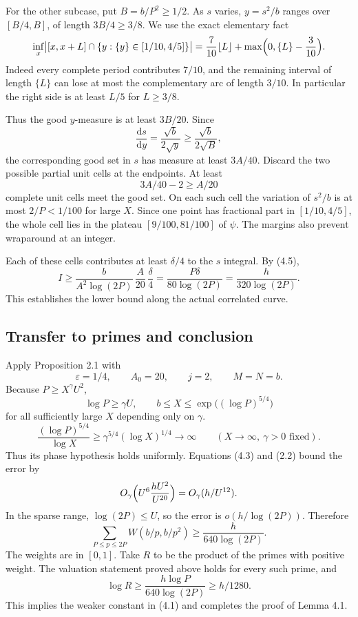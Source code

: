 \documentclass[letterpaper]{article}
\theoremstyle{definition}
\theoremstyle{remark}
\numberwithin{equation}{section}
\begin{document}
For the other subcase, put $B=b/P^2\ge 1/2$. As $s$ varies, $y=s^2/b$ ranges over $[B/4,B]$, of
length $3B/4\ge 3/8$. We use the exact elementary fact
\begin{equation}
  \inf_x\bigl|[x,x+L]\cap\{y:\{y\}\in[1/10,4/5]\}\bigr|=\frac{7}{10}\lfloor L\rfloor+\max\Bigl(0,\{L\}-\frac{3}{10}\Bigr).
\end{equation}
Indeed every complete period contributes $7/10$, and the remaining interval of length $\{L\}$ can
lose at most the complementary arc of length $3/10$. In particular the right side is at least $L/5$
for $L\ge 3/8$.

Thus the good $y$-measure is at least $3B/20$. Since
\[
  \frac{\mathrm ds}{\mathrm dy}=\frac{\sqrt b}{2\sqrt y}\ge\frac{\sqrt b}{2\sqrt B},
\]
the corresponding good set in $s$ has measure at least $3A/40$. Discard the two possible partial
unit cells at the endpoints. At least
\[
  3A/40-2\ge A/20
\]
complete unit cells meet the good set. On each such cell the variation of $s^2/b$ is at most
$2/P<1/100$ for large $X$. Since one point has fractional part in $[1/10,4/5]$, the whole cell lies in
the plateau $[9/100,81/100]$ of $\psi$. The margins also prevent wraparound at an integer.

Each of these cells contributes at least $\delta/4$ to the $s$ integral. By (4.5),
\[
  I\ge\frac{b}{A^2\log(2P)}\,\frac{A}{20}\,\frac{\delta}{4}=\frac{P\delta}{80\log(2P)}=\frac{h}{320\log(2P)}.
\]
This establishes the lower bound along the actual correlated curve.

\subsection{Transfer to primes and conclusion}

Apply Proposition 2.1 with
\[
  \varepsilon=1/4,\qquad A_0=20,\qquad j=2,\qquad M=N=b.
\]
Because $P\ge X^\gamma U^2$,
\[
  \log P\ge\gamma U,\qquad b\le X\le\exp\bigl((\log P)^{5/4}\bigr)
\]
for all sufficiently large $X$ depending only on $\gamma$.
\[
  \frac{(\log P)^{5/4}}{\log X}\ge\gamma^{5/4}(\log X)^{1/4}\longrightarrow\infty\qquad(X\to\infty,\ \gamma>0 \text{ fixed}).
\]
Thus its phase hypothesis holds uniformly. Equations (4.3) and (2.2) bound the error by
\[
  O_\gamma\Bigl(U^6\frac{hU^2}{U^{20}}\Bigr)=O_\gamma(h/U^{12}).
\]
In the sparse range, $\log(2P)\le U$, so the error is $o(h/\log(2P))$. Therefore
\[
  \sum_{P\le p\le 2P}W(b/p,b/p^2)\ge\frac{h}{640\log(2P)}.
\]
The weights are in $[0,1]$. Take $R$ to be the product of the primes with positive weight. The
valuation statement proved above holds for every such prime, and
\[
  \log R\ge\frac{h\log P}{640\log(2P)}\ge h/1280.
\]
This implies the weaker constant in (4.1) and completes the proof of Lemma 4.1.
\end{document}
